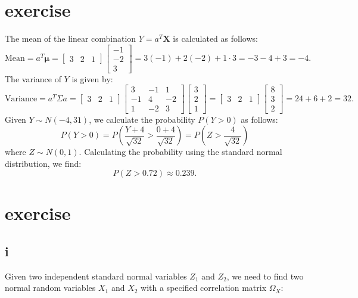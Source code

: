 \documentclass{article}
\begin{document}
\section{exercise}
The mean of the linear combination \(Y = a^T \mathbf{X}\) is calculated as follows:
\[
    \text{Mean} = a^T \boldsymbol{\mu} = \begin{bmatrix} 3 & 2 & 1 \end{bmatrix} \begin{bmatrix} -1 \\ -2 \\ 3 \end{bmatrix} = 3(-1) + 2(-2) + 1 \cdot 3 = -3 - 4 + 3 = -4.
\]
The variance of \(Y\) is given by:
\[
    \text{Variance} = a^T \Sigma a = \begin{bmatrix} 3 & 2 & 1 \end{bmatrix} \begin{bmatrix} 3 & -1 & 1 \\ -1 & 4 & -2 \\ 1 & -2 & 3 \end{bmatrix} \begin{bmatrix} 3 \\ 2 \\ 1 \end{bmatrix} = \begin{bmatrix} 3 & 2 & 1 \end{bmatrix} \begin{bmatrix} 8 \\ 3 \\ 2 \end{bmatrix} = 24 + 6 + 2 = 32.
\]
Given \(Y \sim N(-4, 31)\), we calculate the probability \(P(Y > 0)\) as follows:
\[
    P(Y > 0) = P\left(\frac{Y + 4}{\sqrt{32}} > \frac{0 + 4}{\sqrt{32}}\right) = P\left(Z > \frac{4}{\sqrt{32}}\right)
\]
where \(Z \sim N(0,1)\). Calculating the probability using the standard normal distribution, we find:
\[
    P(Z > 0.72) \approx 0.239.
\]

\section{exercise}
\subsection*{i}
Given two independent standard normal variables $Z_1$ and $Z_2$, we need to find two normal random variables $X_1$ and $X_2$ with a specified correlation matrix $\Omega_X$:
\end{document}
